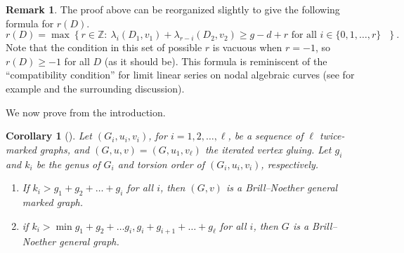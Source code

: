 \documentclass[11pt]{article}
\newtheorem{coro}[theo]{Corollary}
\theoremstyle{definition}
\newtheorem{rema}[theo]{Remark}
\numberwithin{equation}{section}
\newcommand{\Z}{\mathbb{Z}}
\begin{document}
\begin{rema}
The proof above can be reorganized slightly to give the following formula for $r(D)$.
$$
r(D) = \operatorname{max} \left\{ r \in \Z:\ 
\lambda_i(D_1,v_1) + \lambda_{r-i}(D_2,v_2) \geq g-d+r
\mbox{ for all $i \in \{0,1,\ldots,r\}$ }
\right\}.
$$
Note that the condition in this set of possible $r$ is vacuous when $r = -1$, so $r(D) \geq -1$ for all $D$ (as it should be).
This formula is reminiscent of the ``compatibility condition'' for limit linear series on nodal algebraic curves (see for example \cite[Definition 5.33]{HarrisMorrison} and the surrounding discussion).
\end{rema}



We now prove  from the introduction.

\begin{coro}[]
Let $(G_i, u_i, v_i)$, for $i=1,2, \ldots, \ell$, be a sequence of $\ell$ twice-marked graphs, and $(G,u,v) = (G,u_1, v_\ell)$ the iterated vertex gluing. Let $g_i$ and $k_i$ be the genus of $G_i$ and torsion order of $(G_i, u_i, v_i)$, respectively. 
\begin{enumerate}[label = \arabic*)]
    \item If $k_i > g_1 + g_2 + \ldots + g_i$ for all $i$, then $(G,v)$ is a Brill--Noether general marked graph.
    \item if $k_i > \min{g_1 + g_2 + \ldots g_i, g_i + g_{i+1} + \ldots + g_\ell }$ for all $i$, then $G$ is a Brill--Noether general graph.
\end{enumerate}
\end{coro}
\end{document}
